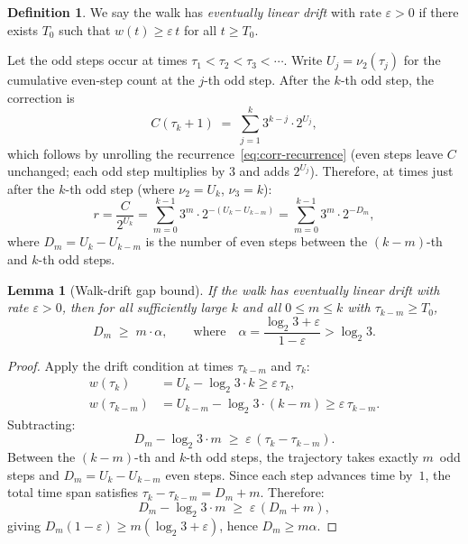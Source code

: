\documentclass[11pt,a4paper]{article}
\theoremstyle{plain}
\newtheorem{lemma}[theorem]{Lemma}
\theoremstyle{definition}
\newtheorem{definition}[theorem]{Definition}
\begin{document}
\begin{definition}
We say the walk has \emph{eventually linear drift} with rate
$\varepsilon > 0$ if there exists $T_0$ such that
$w(t) \ge \varepsilon\, t$ for all $t \ge T_0$.
\end{definition}

Let the odd steps occur at times $\tau_1 < \tau_2 < \tau_3 < \cdots$.
Write $U_j = \nu_2(\tau_j)$ for the cumulative even-step count at the
$j$-th odd step.  After the $k$-th odd step, the correction is
\begin{equation}\label{eq:C-sum}
  C(\tau_k + 1) \;=\; \sum_{j=1}^{k} 3^{k-j} \cdot 2^{U_j},
\end{equation}
which follows by unrolling the recurrence~\eqref{eq:corr-recurrence}
(even steps leave $C$ unchanged; each odd step multiplies by $3$
and adds $2^{U_j}$).  Therefore, at times just after the $k$-th
odd step (where $\nu_2 = U_k$, $\nu_3 = k$):
\begin{equation}\label{eq:r-sum}
  r = \frac{C}{2^{U_k}}
  = \sum_{m=0}^{k-1} 3^m \cdot 2^{-(U_k - U_{k-m})}
  = \sum_{m=0}^{k-1} 3^m \cdot 2^{-D_m},
\end{equation}
where $D_m = U_k - U_{k-m}$ is the number of even steps between the
$(k{-}m)$-th and $k$-th odd steps.

\begin{lemma}[Walk-drift gap bound]\label{lem:D-bound}
If the walk has eventually linear drift with rate $\varepsilon > 0$,
then for all sufficiently large $k$ and all $0 \le m \le k$
with $\tau_{k-m} \ge T_0$,
\[
  D_m \;\ge\; m \cdot \alpha,
  \qquad\text{where}\quad
  \alpha = \frac{\log_2 3 + \varepsilon}{1 - \varepsilon} > \log_2 3.
\]
\end{lemma}

\begin{proof}
Apply the drift condition at times $\tau_{k-m}$ and $\tau_k$:
\begin{align*}
  w(\tau_k) &= U_k - \log_2 3 \cdot k \ge \varepsilon\, \tau_k, \\
  w(\tau_{k-m}) &= U_{k-m} - \log_2 3 \cdot (k-m) \ge \varepsilon\, \tau_{k-m}.
\end{align*}
Subtracting:
\[
  D_m - \log_2 3 \cdot m
  \;\ge\; \varepsilon\,(\tau_k - \tau_{k-m}).
\]
Between the $(k{-}m)$-th and $k$-th odd steps, the trajectory takes
exactly $m$~odd steps and $D_m = U_k - U_{k-m}$ even steps.
Since each step advances time by~$1$, the total time span satisfies
$\tau_k - \tau_{k-m} = D_m + m$.  Therefore:
\[
  D_m - \log_2 3 \cdot m \;\ge\; \varepsilon\,(D_m + m),
\]
giving $D_m(1 - \varepsilon) \ge m(\log_2 3 + \varepsilon)$,
hence $D_m \ge m\alpha$.
\end{proof}
\end{document}
